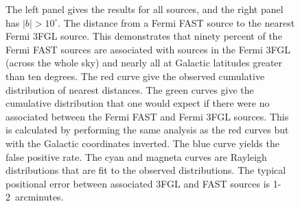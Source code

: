 \documentclass[useAMS,usenatbib]{mn2e}
\begin{document}
\begin{figure}
\caption{The left panel gives the results for all sources, and the right
  panel has $|b|>10^\circ$. The distance from a Fermi FAST source to
  the nearest Fermi 3FGL source.  This demonstrates that ninety
  percent of the Fermi FAST sources are associated with sources in the
  Fermi 3FGL (across the whole sky) and nearly all at Galactic
  latitudes greater than ten degrees. The red curve give the
  observed cumulative distribution of nearest distances.  The green
  curves give the cumulative distribution that one would expect if
  there were no associated between the Fermi FAST and Fermi 3FGL
  sources.  This is calculated by performing the same analysis as the
  red curves but with the Galactic coordinates inverted.  The blue
  curve yields the false positive rate.  The cyan and magneta curves
  are Rayleigh distributions that are fit to the observed
  distributions.  The typical positional error between associated 3FGL
  and FAST sources is 1-2~arcminutes.  }
\label{fig:corresponances}
\end{figure}
\end{document}
